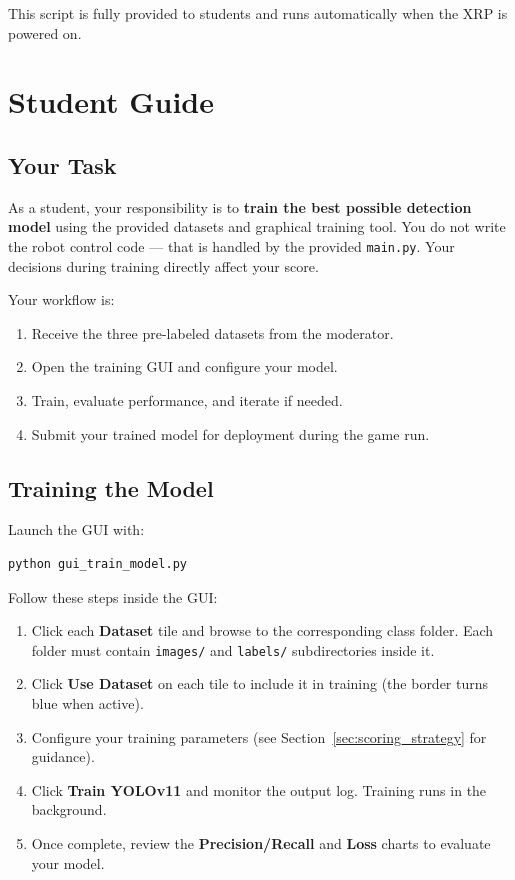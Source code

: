\documentclass[11pt,a4paper]{article}
\begin{document}
This script is fully provided to students and runs automatically when the XRP is powered on.

\section{Student Guide}

\subsection{Your Task}

As a student, your responsibility is to \textbf{train the best possible detection model} using the provided datasets and graphical training tool. You do not write the robot control code — that is handled by the provided \texttt{main.py}. Your decisions during training directly affect your score.

Your workflow is:
\begin{enumerate}
    \item Receive the three pre-labeled datasets from the moderator.
    \item Open the training GUI and configure your model.
    \item Train, evaluate performance, and iterate if needed.
    \item Submit your trained model for deployment during the game run.
\end{enumerate}

\subsection{Training the Model}

Launch the GUI with:

\begin{lstlisting}[language=bash]
python gui_train_model.py
\end{lstlisting}

Follow these steps inside the GUI:

\begin{enumerate}
    \item Click each \textbf{Dataset} tile and browse to the corresponding class folder. Each folder must contain \texttt{images/} and \texttt{labels/} subdirectories inside it.
    \item Click \textbf{Use Dataset} on each tile to include it in training (the border turns blue when active).
    \item Configure your training parameters (see Section~\ref{sec:scoring_strategy} for guidance).
    \item Click \textbf{Train YOLOv11} and monitor the output log. Training runs in the background.
    \item Once complete, review the \textbf{Precision/Recall} and \textbf{Loss} charts to evaluate your model.
\end{enumerate}
\end{document}
